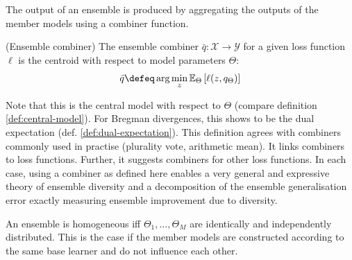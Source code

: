 \documentclass[
	twoside=false, %
]{kaobook}
\begin{document}
The output of an ensemble is produced by aggregating the outputs of the member models using a combiner function. 
\begin{definition}
   \label{def:ensemble-combiner}
   (Ensemble combiner) The ensemble combiner $\bar{q} : \mathcal{X} \to \mathcal{Y}$ for a given loss function $\ell$ is the centroid with respect to model parameters $\Theta$: 
$$
\bar{q} \defeq \arg\min_z \mathbb{E}_\Theta \left[ \ell(z, q_\Theta) \right]
$$
\end{definition}
Note that this is the central model with respect to $\Theta$ (compare definition \ref{def:central-model}).
For Bregman divergences, this shows to be the dual expectation (def. \ref{def:dual-expectation}). This definition agrees with combiners commonly used in practise (plurality vote, arithmetic mean). It links combiners to loss functions. Further, it suggests combiners for other loss functions. In each case, using a combiner as defined here enables a very general and expressive theory of ensemble diversity and a decomposition of the ensemble generalisation error exactly measuring ensemble improvement due to diversity.

An ensemble is homogeneous iff $\Theta_{1}, \dots, \Theta_{M}$ are identically and independently distributed. This is the case if the member models are constructed according to the same base learner and do not influence each other. 
\end{document}
